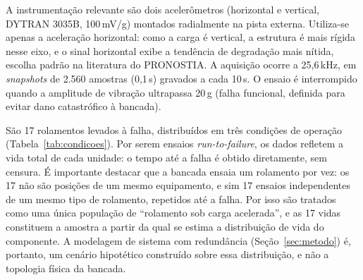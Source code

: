 \documentclass[conference]{IEEEtran}
\begin{document}
A instrumentação relevante são dois acelerômetros (horizontal e vertical,
DYTRAN 3035B, 100\,mV/g) montados radialmente na pista externa. Utiliza-se apenas a
aceleração horizontal: como a carga é vertical, a estrutura é mais rígida
nesse eixo, e o sinal horizontal exibe a tendência de degradação mais nítida,
escolha padrão na literatura do PRONOSTIA. A aquisição ocorre a 25,6\,kHz, em
\textit{snapshots} de 2.560 amostras (0,1\,s) gravados a cada 10\,s.
O ensaio é interrompido quando a amplitude de vibração ultrapassa 20\,g
(falha funcional, definida para evitar dano catastrófico à bancada).

São 17 rolamentos levados à falha, distribuídos em três condições de
operação (Tabela~\ref{tab:condicoes}). Por serem ensaios \textit{run-to-failure}, os
dados refletem a vida total de cada unidade: o tempo até a falha é obtido
diretamente, sem censura. É importante destacar que a bancada ensaia um
rolamento por vez: os 17 não são posições de um mesmo equipamento, e sim
17 ensaios independentes de um mesmo tipo de rolamento, repetidos até a
falha. Por isso são tratados como uma única população de ``rolamento sob
carga acelerada'', e as 17 vidas constituem a amostra a partir da qual se
estima a distribuição de vida do componente. A modelagem de sistema com
redundância (Seção~\ref{sec:metodo}) é, portanto, um cenário hipotético
construído sobre essa distribuição, e não a topologia física da bancada.
\end{document}
